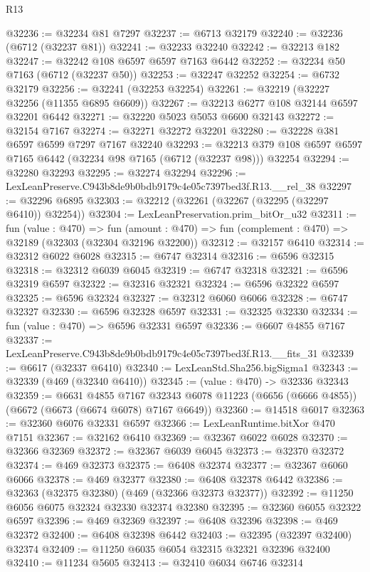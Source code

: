 \begin{lexlean}{R13}
\begin{coremodule}
@32236 := @32234 @81 @7297
@32237 := @6713 @32179
@32240 := @32236 (@6712 (@32237 @81))
@32241 := @32233 @32240
@32242 := @32213 @182
@32247 := @32242 @108 @6597 @6597 @7163 @6442
@32252 := @32234 @50 @7163 (@6712 (@32237 @50))
@32253 := @32247 @32252
@32254 := @6732 @32179
@32256 := @32241 (@32253 @32254)
@32261 := @32219 (@32227 @32256 (@11355 @6895 @6609))
@32267 := @32213 @6277 @108 @32144 @6597 @32201 @6442
@32271 := @32220 @5023 @5053 @6600 @32143
@32272 := @32154 @7167
@32274 := @32271 @32272 @32201
@32280 := @32228 @381 @6597 @6599 @7297 @7167 @32240
@32293 := @32213 @379 @108 @6597 @6597 @7165 @6442 (@32234 @98 @7165 (@6712 (@32237 @98))) @32254
@32294 := @32280 @32293
@32295 := @32274 @32294
@32296 := LexLeanPreserve.C943b8de9b0bdb9179c4e05c7397bed3f.R13.__rel_38
@32297 := @32296 @6895
@32303 := @32212 (@32261 (@32267 (@32295 (@32297 @6410)) @32254))
@32304 := LexLeanPreservation.prim_bitOr_u32
@32311 := fun (value : @470) =>
  fun (amount : @470) => fun (complement : @470) => @32189 (@32303 (@32304 @32196 @32200))
@32312 := @32157 @6410
@32314 := @32312 @6022 @6028
@32315 := @6747 @32314
@32316 := @6596 @32315
@32318 := @32312 @6039 @6045
@32319 := @6747 @32318
@32321 := @6596 @32319 @6597
@32322 := @32316 @32321
@32324 := @6596 @32322 @6597
@32325 := @6596 @32324
@32327 := @32312 @6060 @6066
@32328 := @6747 @32327
@32330 := @6596 @32328 @6597
@32331 := @32325 @32330
@32334 := fun (value : @470) => @6596 @32331 @6597
@32336 := @6607 @4855 @7167
@32337 := LexLeanPreserve.C943b8de9b0bdb9179c4e05c7397bed3f.R13.__fits_31
@32339 := @6617 (@32337 @6410)
@32340 := LexLeanStd.Sha256.bigSigma1
@32343 := @32339 (@469 (@32340 @6410))
@32345 := (value : @470) -> @32336 @32343
@32359 := @6631
    @4855
    @7167
    @32343
    @6078
    @11223
    (@6656 (@6666 @4855))
    (@6672 (@6673 (@6674 @6078) @7167 @6649))
@32360 := @14518 @6017
@32363 := @32360 @6076 @32331 @6597
@32366 := LexLeanRuntime.bitXor @470 @7151
@32367 := @32162 @6410
@32369 := @32367 @6022 @6028
@32370 := @32366 @32369
@32372 := @32367 @6039 @6045
@32373 := @32370 @32372
@32374 := @469 @32373
@32375 := @6408 @32374
@32377 := @32367 @6060 @6066
@32378 := @469 @32377
@32380 := @6408 @32378 @6442
@32386 := @32363 (@32375 @32380) (@469 (@32366 @32373 @32377))
@32392 := @11250 @6056 @6075 @32324 @32330 @32374 @32380
@32395 := @32360 @6055 @32322 @6597
@32396 := @469 @32369
@32397 := @6408 @32396
@32398 := @469 @32372
@32400 := @6408 @32398 @6442
@32403 := @32395 (@32397 @32400) @32374
@32409 := @11250 @6035 @6054 @32315 @32321 @32396 @32400
@32410 := @11234 @5605
@32413 := @32410 @6034 @6746 @32314

\end{coremodule}
\end{lexlean}
